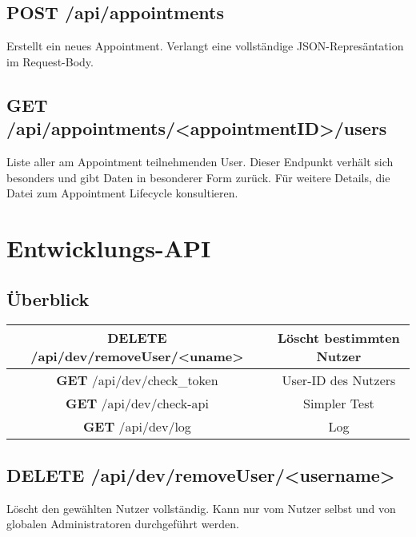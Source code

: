 \documentclass[11pt,a4paper]{article}
\begin{document}
\subsection{\textbf{POST} /api/appointments}
Erstellt ein neues Appointment. Verlangt eine vollständige JSON-Represäntation im Request-Body.
\subsection{\textbf{GET} /api/appointments/<appointmentID>/users}
Liste aller am Appointment teilnehmenden User. 
Dieser Endpunkt verhält sich besonders und gibt Daten in besonderer Form zurück. 
Für weitere Details, die Datei zum Appointment Lifecycle konsultieren.

\section{Entwicklungs-API}
\subsection{Überblick}

\begin{tabular}{|c|c|}
\hline
\textbf{DELETE} /api/dev/removeUser/<uname> & Löscht bestimmten Nutzer \\
\hline
\textbf{GET} /api/dev/check\_token & User-ID des Nutzers \\
\hline
\textbf{GET} /api/dev/check-api & Simpler Test \\
\hline
\textbf{GET} /api/dev/log & Log \\
\hline
\end{tabular}

\subsection{\textbf{DELETE} /api/dev/removeUser/<username>}
Löscht den gewählten Nutzer vollständig. Kann nur vom Nutzer selbst und von globalen Administratoren durchgeführt werden.
\end{document}
